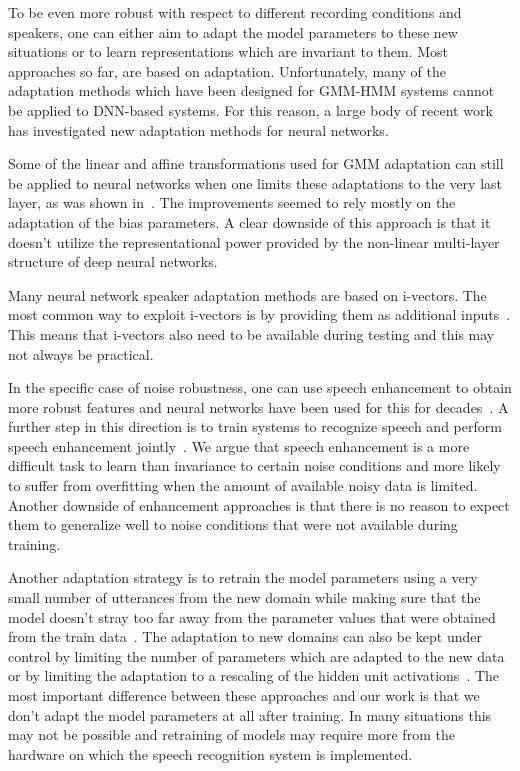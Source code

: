\documentclass[a4paper]{article}
\begin{document}
    To be even more robust with respect to different recording conditions and speakers,
    one can either aim to adapt the model parameters to these new situations or
    to learn representations which are invariant to them.
    Most approaches so far, are based on adaptation.
    Unfortunately, many of the adaptation methods which have been designed for
    GMM-HMM systems cannot be applied to DNN-based systems. For this reason, a
    large body of recent work has investigated new adaptation methods for neural
    networks.

    Some of the linear and affine transformations used for GMM adaptation can
    still be applied to neural networks when one limits these adaptations to the
    very last layer, as was shown in~\cite{yao2012adaptation}. The
    improvements seemed to rely mostly on the adaptation of the bias parameters.
    A clear downside of this approach is that it doesn't utilize the
    representational power provided by the non-linear multi-layer structure of deep
    neural networks.

    Many neural network speaker adaptation methods are based on
    i-vectors. The most common way to exploit i-vectors is by providing them as additional
    inputs~\citep{senior2014improving,saon2013speaker}. This means that i-vectors also need to
    be available during testing and this may not always be practical.

    In the specific case of noise robustness, one can use speech enhancement to
    obtain more robust features and neural networks have been used for this for
    decades~\citep{knecht1995neural}. A further step in this direction is to train
    systems to recognize speech and perform speech enhancement jointly~\citep{narayanan2014joint}. 
    We argue that speech enhancement is a more difficult task to learn than
    invariance to certain noise conditions and more likely to suffer from
    overfitting when the amount of available noisy data is limited.
    Another downside of enhancement approaches is that there is no reason to
    expect them to generalize well to noise conditions that were not available during
    training.

    Another adaptation strategy is to retrain the model parameters using a very small
    number of utterances from the new domain while making sure that the model
    doesn't stray too far away from the parameter values that were obtained from
    the train data~\citep{yu2013kl}.
    The adaptation to new domains can also be kept under control by limiting
    the number of parameters which are adapted to the new data or by limiting the
    adaptation to a rescaling of the hidden unit activations~\citep{swietojanski2014learning}.
    The most important difference between these approaches and our work is that
    we don't adapt the model parameters at all after training. In many
    situations this may not be possible and retraining of models may require more
    from the hardware on which the speech recognition system is implemented.
\end{document}

